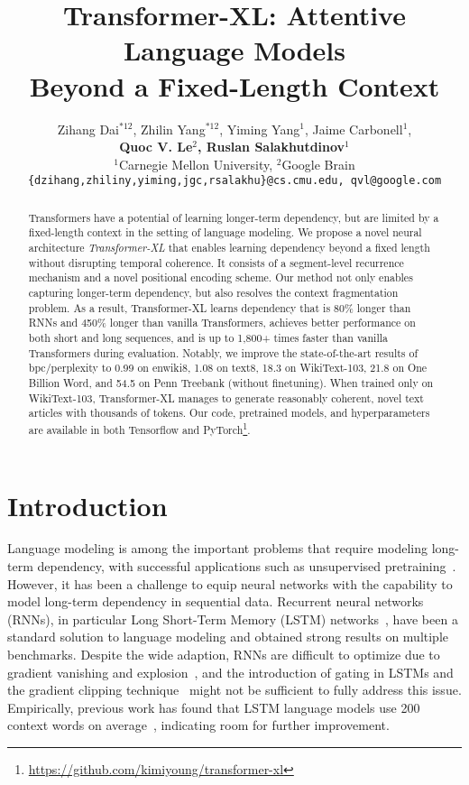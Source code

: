 \documentclass[11pt,a4paper]{article}
\title{Transformer-XL: Attentive Language Models \\ Beyond a Fixed-Length Context}
\author{Zihang Dai$^{*12}$, Zhilin Yang$^{*12}$, Yiming Yang$^1$, Jaime Carbonell$^1$, \\
	{\bf Quoc V. Le$^2$, Ruslan Salakhutdinov$^1$ }\\
	$^1$Carnegie Mellon University, $^2$Google Brain \\
	{\small \texttt{\{dzihang,zhiliny,yiming,jgc,rsalakhu\}@cs.cmu.edu, qvl@google.com} } 
}
\date{}
\begin{document}
\maketitle


\renewcommand{\thefootnote}{\fnsymbol{footnote}}
\renewcommand{\thefootnote}{\arabic{footnote}}

\begin{abstract}

Transformers have a potential of learning longer-term dependency, but are limited by a fixed-length context in the setting of language modeling.
We propose a novel neural architecture \textit{Transformer-XL} that enables learning dependency beyond a fixed length without disrupting temporal coherence. It consists of a segment-level recurrence mechanism and a novel positional encoding scheme. Our method not only enables capturing longer-term dependency, but also resolves the context fragmentation problem. As a result, Transformer-XL learns dependency that is 80\% longer than RNNs and 450\% longer than vanilla Transformers, achieves better performance on both short and long sequences, and is up to 1,800+ times faster than vanilla Transformers during evaluation.
Notably, we improve the state-of-the-art results of bpc/perplexity to 0.99 on enwiki8, 1.08 on text8, 18.3 on WikiText-103, 21.8 on One Billion Word, and 54.5 on Penn Treebank (without finetuning).
When trained only on WikiText-103, Transformer-XL manages to generate reasonably coherent, novel text articles with thousands of tokens.
Our code, pretrained models, and hyperparameters are available in both Tensorflow and PyTorch\footnote{\url{https://github.com/kimiyoung/transformer-xl}}.










\end{abstract} \section{Introduction}
\label{sec:intro}

Language modeling is among the important problems that require modeling long-term dependency, with successful applications such as unsupervised pretraining~\citep{dai2015semi,peters2018deep,radford2018improving,devlin2018bert}.
However, it has been a challenge to equip neural networks with the capability to model long-term dependency in sequential data.
Recurrent neural networks (RNNs), in particular Long Short-Term Memory (LSTM) networks~\citep{hochreiter1997long}, have been a standard solution to language modeling and obtained strong results on multiple benchmarks.
Despite the wide adaption, RNNs are difficult to optimize due to gradient vanishing and explosion~\citep{hochreiter2001gradient}, and the introduction of gating in LSTMs and the gradient clipping technique~\citep{graves2013generating} might not be sufficient to fully address this issue.
Empirically, previous work has found that LSTM language models use 200 context words on average~\citep{khandelwal2018sharp}, indicating room for further improvement.
\end{document}
